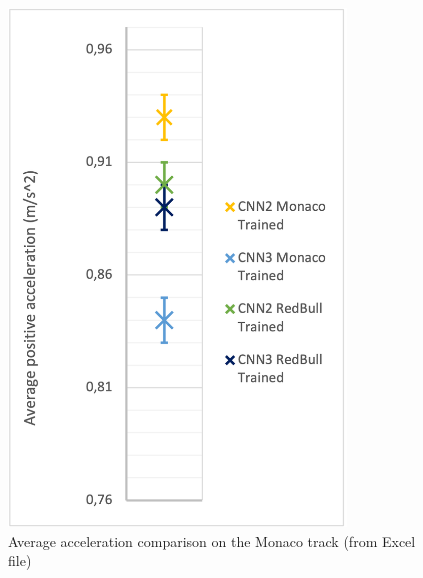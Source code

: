 \begin{figure}
    \centering
    \begin{minipage}{0.45\textwidth}
        \centering
        \includegraphics[width=0.8\textwidth]{Figures/H3_accel.png}
        \caption{Average acceleration comparison on the Monaco track (from Excel file)}
        \label{h3_accel}
    \end{minipage}\hfill
    \begin{minipage}{0.45\textwidth}
        \centering

\end{minipage}
\end{figure}
